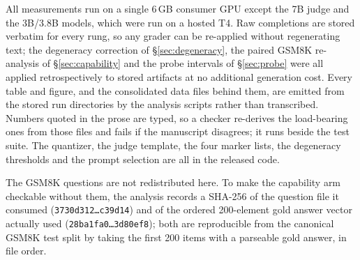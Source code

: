 \documentclass[11pt,a4paper]{article}
\begin{document}
All measurements run on a single 6\,GB consumer GPU except the 7B judge and the
3B/3.8B models, which were run on a hosted T4. Raw completions are stored
verbatim for every rung, so any grader can be re-applied without regenerating
text; the degeneracy correction of \S\ref{sec:degeneracy}, the paired GSM8K
re-analysis of \S\ref{sec:capability} and the probe intervals of
\S\ref{sec:probe} were all applied retrospectively to stored artifacts at no
additional generation cost. Every table and figure, and the consolidated data
files behind them, are emitted from the stored run directories by the analysis
scripts rather than transcribed. Numbers quoted in the prose are typed, so a
checker re-derives the load-bearing ones from those files and fails if the
manuscript disagrees; it runs beside the test suite. The quantizer, the judge template, the four marker lists, the
degeneracy thresholds and the prompt selection are all in the released code.

The GSM8K questions are not redistributed here. To make the capability arm
checkable without them, the analysis records a SHA-256 of the question file it
consumed (\texttt{3730d312\ldots c39d14}) and of the ordered 200-element gold
answer vector actually used (\texttt{28ba1fa0\ldots 3d80ef8}); both are
reproducible from the canonical GSM8K test split by taking the first 200 items
with a parseable gold answer, in file order.


\end{document}

